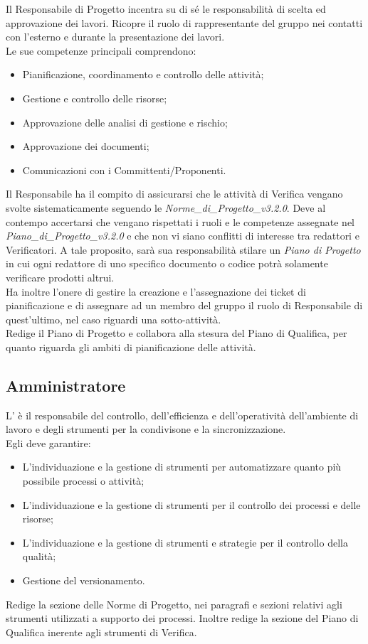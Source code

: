 Il Responsabile di Progetto incentra su di sé le responsabilità di scelta ed approvazione dei lavori. Ricopre il ruolo di rappresentante del gruppo nei contatti con l'esterno e durante la presentazione dei lavori.\\
Le sue competenze principali comprendono:
\begin{itemize}
\item Pianificazione, coordinamento e controllo delle attivit\`{a};
\item Gestione e controllo delle risorse;
\item Approvazione delle analisi di gestione e rischio;
\item Approvazione dei documenti;
\item Comunicazioni con i Committenti/Proponenti.
\end{itemize}
Il Responsabile ha il compito di assicurarsi che le attivit\`{a} di Verifica vengano svolte sistematicamente seguendo le \emph{Norme\_di\_Progetto\_v3.2.0}. Deve al contempo accertarsi che vengano rispettati i ruoli e le competenze assegnate nel \emph{Piano\_di\_Progetto\_v3.2.0} e che non vi siano conflitti di interesse tra redattori e Verificatori. A tale proposito, sarà sua responsabilità stilare un \emph{Piano di Progetto} in cui ogni redattore di uno specifico documento o codice potrà solamente verificare prodotti altrui.\\
Ha inoltre l'onere di gestire la creazione e l'assegnazione dei ticket di pianificazione e di assegnare ad un membro del gruppo il ruolo di Responsabile di quest'ultimo, nel caso riguardi una sotto-attivit\`{a}.\\
Redige il Piano di Progetto e collabora alla stesura del Piano di Qualifica, per quanto riguarda gli ambiti di pianificazione delle attivit\`{a}.

\subsection{Amministratore}

L' è il responsabile del controllo, dell'efficienza e dell'operatività dell'ambiente di lavoro e degli strumenti per la condivisone e la sincronizzazione.\\
Egli deve garantire:
\begin{itemize}
\item L'individuazione e la gestione di strumenti per automatizzare quanto più possibile processi o attivit\`{a};
\item L'individuazione e la gestione di strumenti per il controllo dei processi e delle risorse;
\item L'individuazione e la gestione di strumenti e strategie per il controllo della qualità;
\item Gestione del versionamento.
\end{itemize}
Redige la sezione delle Norme di Progetto, nei paragrafi e sezioni relativi agli strumenti utilizzati a supporto dei processi. Inoltre redige la sezione del Piano di Qualifica inerente agli strumenti di Verifica.

